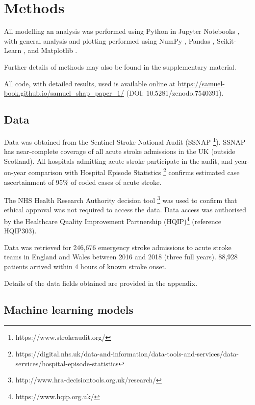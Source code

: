 \renewcommand{\thefootnote}{\alph{footnote}} %

\section{Methods}

All modelling an analysis was performed using Python in Jupyter Notebooks \cite{kluyver_jupyter_2016}, with general analysis and plotting performed using NumPy \cite{harris_array_2020}, Pandas \cite{mckinney-proc-scipy-2010}, Scikit-Learn  \cite{pedregosa_scikit-learn_2011}, and Matplotlib \cite{hunter_matplotlib_2007}. 

Further details of methods may also be found in the supplementary material. 

All code, with detailed results, used is available online at \url{https://samuel-book.github.io/samuel_shap_paper_1/} (DOI: 10.5281/zenodo.7540391). 

\subsection{Data}

Data was obtained from the Sentinel Stroke National Audit (SSNAP \footnote{https://www.strokeaudit.org/}). SSNAP has near-complete coverage of all acute stroke admissions in the UK (outside Scotland). All hospitals admitting acute stroke participate in the audit, and year-on-year comparison with Hospital Episode Statistics \footnote{https://digital.nhs.uk/data-and-information/data-tools-and-services/data-services/hospital-episode-statistics} confirms estimated case ascertainment of 95\% of coded cases of acute stroke.

The NHS Health Research Authority decision tool \footnote{http://www.hra-decisiontools.org.uk/research/} was used to confirm that ethical approval was not required to access the data. Data access was authorised by the Healthcare Quality Improvement Partnership (HQIP)\footnote{https://www.hqip.org.uk/} (reference HQIP303). 

Data was retrieved for 246,676 emergency stroke admissions to acute stroke teams in England and Wales between 2016 and 2018 (three full years). 88,928 patients arrived within 4 hours of known stroke onset.

Details of the data fields obtained are provided in the appendix.

\subsection{Machine learning models}

